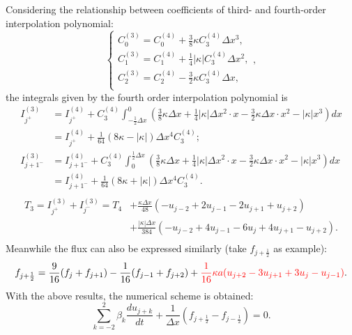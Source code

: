 \documentclass[]{article}
\def\jph{{j+\frac{1}{2}}}
\def\jmh{{j-\frac{1}{2}}}
\def\abs#1{\left|#1\right|}
\begin{document}
Considering the relationship between coefficients of third- and fourth-order
interpolation polynomial:
\begin{equation}
\left\{\begin{array}{l}
\displaystyle
C_0^{(3)}=C_0^{(4)}+\frac{3}{8}\kappa C_3^{(4)}\Delta x^3, \\[3mm]
\displaystyle
C_1^{(3)}=C_1^{(4)}+\frac{1}{4}\abs{\kappa} C_3^{(4)}\Delta x^2, \\[3mm]
\displaystyle
C_2^{(3)}=C_2^{(4)}-\frac{3}{2}\kappa C_3^{(4)}\Delta x, \\
\end{array},\right. 
\label{eq:C3-C4}
\end{equation}
the integrals given by the fourth order interpolation polynomial is
\[
\begin{array}{ll}
I^{(3)}_{j^+}&\displaystyle =I^{(4)}_{j^+}+C_3^{(4)}\int_{-\frac{1}{2}\Delta x}^0 \left(\frac{3}{8}\kappa \Delta x +\frac{1}{4}\abs{\kappa}\Delta x^2\cdot x -\frac{3}{2}\kappa \Delta x\cdot x^2 -\abs{\kappa}x^3\right) dx \\[4mm]
&\displaystyle = I^{(4)}_{j^+}+\frac{1}{64}\left(8\kappa-\abs{\kappa}\right)\Delta x^4C_3^{(4)}; \\[4mm]
I^{(3)}_{j+1^-}&\displaystyle =I^{(4)}_{j+1^-}+C_3^{(4)}\int_0^{\frac{1}{2}\Delta x} \left(\frac{3}{8}\kappa \Delta x +\frac{1}{4}\abs{\kappa}\Delta x^2\cdot x -\frac{3}{2}\kappa \Delta x\cdot x^2 -\abs{\kappa}x^3\right) dx \\[4mm]
&\displaystyle= I^{(4)}_{j+1^-}+\frac{1}{64}\left(8\kappa+\abs{\kappa}\right)\Delta x^4C_3^{(4)}.\\
\end{array}
\]
\[
\begin{array}{ll}
T_3 = I^{(3)}_{j^+}+ I^{(3)}_{j^-} = T_4&\displaystyle +\frac{\kappa\Delta x}{48}(-u_{j-2}+2u_{j-1}-2u_{j+1}+u_{j+2}) \\[4mm]
&\displaystyle +\frac{\abs{\kappa}\Delta x}{384} (-u_{j-2}+4u_{j-1}-6u_j+4u_{j+1}-u_{j+2}). \\
\end{array}
\]
Meanwhile the flux can also be expressed similarly (take $f_\jph$ as example):
\[
f_{\jph}=\frac{9}{16}(f_j+f_{j+1})-\frac{1}{16}(f_{j-1}+f_{j+2})+{\color{red}\frac{1}{16}\kappa a(u_{j+2}-3u_{j+1}+3u_{j}-u_{j-1})}.
\]
With the above results, the numerical scheme is obtained:
\begin{equation}
\sum_{k=-2}^2\beta_k \frac{d u_{j+k}}{dt}+\frac{1}{\Delta
x}\left(f_{\jph}-f_{\jmh}\right)=0.
\label{eq:QUICK-duj-dt-nodal}
\end{equation}
\end{document}
